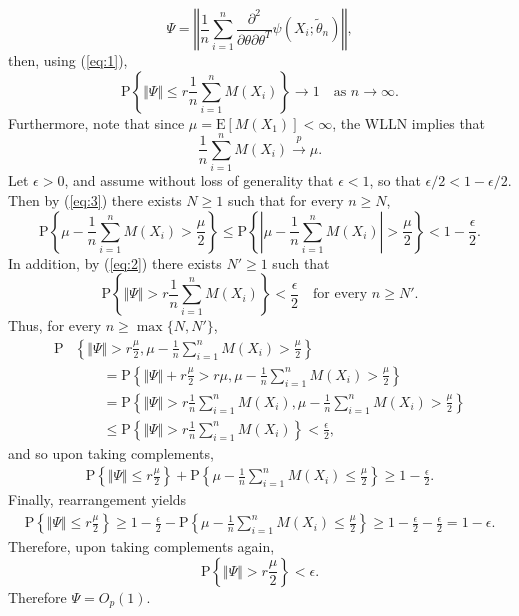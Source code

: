 \documentclass[12pt]{article}
\newcommand{\E}{\mathrm{E}}
\newcommand{\Prob}{\mathrm{P}}
\begin{document}
\begin{enumerate}
\begin{equation*}
\Psi = \left\Vert \frac{1}{n} \sum_{i=1}^n \frac{\partial^2}{\partial \theta \partial \theta^T} \psi(X_i; \tilde{\theta}_n) \right\Vert,
\end{equation*}
then, using (\ref{eq:1}),
\begin{equation} \label{eq:2}
\Prob \left\{\Vert \Psi \Vert \leq r\frac{1}{n} \sum_{i=1}^n M(X_i) \right\} \to 1 \quad \text{as $n \to \infty$}.
\end{equation}
Furthermore, note that since $\mu = \E[M(X_1)] < \infty$, the WLLN implies that
\begin{equation} \label{eq:3}
\frac{1}{n} \sum_{i=1}^n M(X_i) \overset{p}\to \mu.
\end{equation}
Let $\epsilon > 0$, and assume without loss of generality that $\epsilon < 1$, so that $\epsilon/2 < 1 - \epsilon/2$. Then by (\ref{eq:3}) there exists $N \geq 1$ such that for every $n \geq N$,
\begin{equation*}
\Prob\left\{\mu - \frac{1}{n} \sum_{i=1}^n M(X_i) > \frac{\mu}{2}\right\} \leq \Prob\left\{\left|\mu - \frac{1}{n} \sum_{i=1}^n M(X_i)\right| > \frac{\mu}{2}\right\} < 1 - \frac{\epsilon}{2}.
\end{equation*}
In addition, by (\ref{eq:2}) there exists $N' \geq 1$ such that
\begin{equation*}
\Prob \left\{\Vert \Psi \Vert > r\frac{1}{n} \sum_{i=1}^n M(X_i) \right\} < \frac{\epsilon}{2} \quad \text{for every $n \geq N'$}.
\end{equation*}
Thus, for every $n \geq \max\{N, N'\}$,
\begin{align*}
\Prob &\left\{\Vert \Psi \Vert > r\frac{\mu}{2}, \mu - \frac{1}{n} \sum_{i=1}^n M(X_i) > \frac{\mu}{2} \right\} \\
&\qquad = \Prob \left\{\Vert \Psi \Vert + r\frac{\mu}{2} > r\mu, \mu - \frac{1}{n} \sum_{i=1}^n M(X_i) > \frac{\mu}{2} \right\} \\
&\qquad = \Prob \left\{\Vert \Psi \Vert > r\frac{1}{n} \sum_{i=1}^n M(X_i), \mu - \frac{1}{n} \sum_{i=1}^n M(X_i) > \frac{\mu}{2} \right\} \\
&\qquad \leq \Prob \left\{\Vert \Psi \Vert > r\frac{1}{n} \sum_{i=1}^n M(X_i) \right\} < \frac{\epsilon}{2},
\end{align*}
and so upon taking complements,
\begin{align*}
\Prob \left\{\Vert \Psi \Vert \leq r\frac{\mu}{2} \right\} + \Prob\left\{\mu - \frac{1}{n} \sum_{i=1}^n M(X_i) \leq \frac{\mu}{2} \right\} \geq 1 - \frac{\epsilon}{2}.
\end{align*}
Finally, rearrangement yields
\begin{align*}
\Prob \left\{\Vert \Psi \Vert \leq r\frac{\mu}{2} \right\} \geq 1 - \frac{\epsilon}{2} - \Prob\left\{\mu - \frac{1}{n} \sum_{i=1}^n M(X_i) \leq \frac{\mu}{2} \right\} \geq 1 - \frac{\epsilon}{2} - \frac{\epsilon}{2} = 1 - \epsilon.
\end{align*}
Therefore, upon taking complements again,
\begin{equation*}
\Prob \left\{\Vert \Psi \Vert > r\frac{\mu}{2} \right\} < \epsilon.
\end{equation*}
Therefore $\Psi = O_p(1)$.


\end{enumerate}
\end{document}
